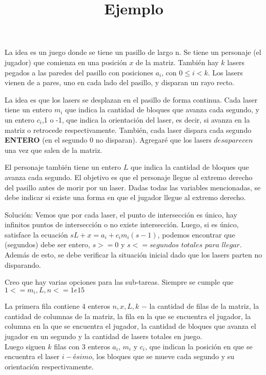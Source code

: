 \documentclass{oci}
\title{Ejemplo}
\begin{document}
\begin{problemDescription}

La idea es un juego donde se tiene un pasillo de largo n. Se tiene un personaje (el jugador) que comienza en una posición $x$ de la matriz. También hay $k$ lasers pegados a las paredes del pasillo con posiciones $a_i$, con $0\leq i<k$. Los lasers vienen de a pares, uno en cada lado del pasillo, y disparan un rayo recto.

La idea es que los lasers se desplazan en el pasillo de forma continua. Cada laser tiene un entero $m_i$ que indica la cantidad de bloques que avanza cada segundo, y un entero $c_i$,1 o -1, que indica la orientación del laser, es decir, si avanza en la matriz o retrocede respectivamente. También, cada laser dispara cada segundo \textbf{ENTERO} (en el segundo 0 no disparan). Agregaré que los lasers $desaparecen$ una vez que salen de la matriz.

El personaje también tiene un entero $L$ que indica la cantidad de bloques que avanza cada segundo. El objetivo es que el personaje llegue al extremo derecho del pasillo antes de morir por un laser. Dadas todas las variables mencionadas, se debe indicar si existe una forma en que el jugador llegue al extremo derecho.

Solución: Vemos que por cada laser, el punto de intersección es único, hay infinitos puntos de intersección o no existe intersección. Luego, si es único, satisface la ecuación $sL+x=a_i+c_im_i(s-1)$, podemos encontrar que (segundos) debe ser entero, $s>=0$ y $s<=segundos$ $totales$ $para$ $llegar$. Además de esto, se debe verificar la situación inicial dado que los lasers parten no disparando. 

Creo que hay varias opciones para las sub-tareas. Siempre se cumple que $1<=m_i, L, n<=1e15$
\end{problemDescription}

\begin{inputDescription}
La primera fila contiene 4 enteros $n, x, L, k$ $-$ la cantidad de filas de la matriz, la cantidad de columnas de la matriz, la fila en la que se encuentra el jugador, la columna en la que se encuentra el jugador, la cantidad de bloques que avanza el jugador en un segundo y la cantidad de lasers totales en juego.\\
Luego siguen $k$ filas con 3 enteros $a_i$, $m_i$ y $c_i$, que indican la posición en que se encuentra el laser $i-ésimo$, los bloques que se mueve cada segundo y su orientación respectivamente.
\end{inputDescription}
\end{document}
